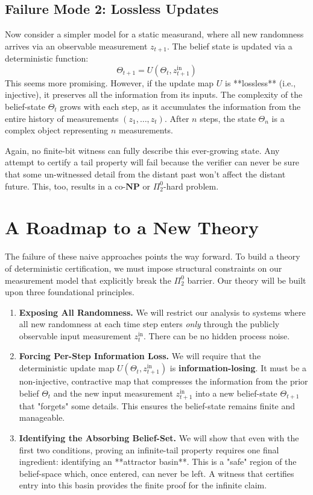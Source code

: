 \documentclass[12pt]{article}
\begin{document}
\subsection{Failure Mode 2: Lossless Updates}
Now consider a simpler model for a static measurand, where all new randomness arrives via an observable measurement $z_{t+1}$. The belief state is updated via a deterministic function:
\[
\Theta_{t+1} = U(\Theta_t, z^{\text{in}}_{t+1})
\]
This seems more promising. However, if the update map $U$ is **lossless** (i.e., injective), it preserves all the information from its inputs. The complexity of the belief-state $\Theta_t$ grows with each step, as it accumulates the information from the entire history of measurements $(z_1, \dots, z_t)$. After $n$ steps, the state $\Theta_n$ is a complex object representing $n$ measurements.

Again, no finite-bit witness can fully describe this ever-growing state. Any attempt to certify a tail property will fail because the verifier can never be sure that some un-witnessed detail from the distant past won't affect the distant future. This, too, results in a co-$\mathbf{NP}$ or $\Pi^0_2$-hard problem.

\section{A Roadmap to a New Theory}

The failure of these naive approaches points the way forward. To build a theory of deterministic certification, we must impose structural constraints on our measurement model that explicitly break the $\Pi^0_2$ barrier. Our theory will be built upon three foundational principles.

\begin{enumerate}
    \item \textbf{Exposing All Randomness.} We will restrict our analysis to systems where all new randomness at each time step enters \emph{only} through the publicly observable input measurement $z^{\text{in}}_t$. There can be no hidden process noise.

    \item \textbf{Forcing Per-Step Information Loss.} We will require that the deterministic update map $U(\Theta_t, z^{\text{in}}_{t+1})$ is \textbf{information-losing}. It must be a non-injective, contractive map that compresses the information from the prior belief $\Theta_t$ and the new input measurement $z^{\text{in}}_{t+1}$ into a new belief-state $\Theta_{t+1}$ that "forgets" some details. This ensures the belief-state remains finite and manageable.

    \item \textbf{Identifying the Absorbing Belief-Set.} We will show that even with the first two conditions, proving an infinite-tail property requires one final ingredient: identifying an **attractor basin**. This is a "safe" region of the belief-space which, once entered, can never be left. A witness that certifies entry into this basin provides the finite proof for the infinite claim.
\end{enumerate}
\end{document}
